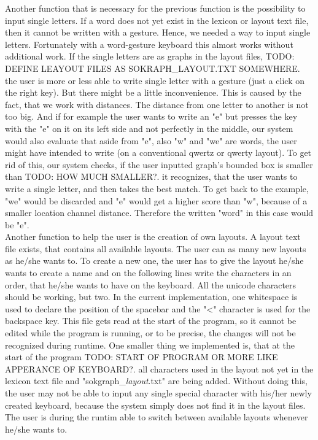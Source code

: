 Another function that is necessary for the previous function is the possibility to input single letters. If a word does not yet exist in the lexicon or layout text file, then it cannot be written with a gesture. Hence, we needed a way to input single letters. Fortunately with a word-gesture keyboard this almost works without additional work. If the single letters are as graphs in the layout files, TODO: DEFINE LEAYOUT FILES AS SOKRAPH_LAYOUT.TXT SOMEWHERE. the user is more or less able to write single letter with a gesture (just a click on the right key). But there might be a little inconvenience. This is caused by the fact, that we work with distances. The distance from one letter to another is not too big. And if for example the user wants to write an "e" but presses the key with the "e" on it on its left side and not perfectly in the middle, our system would also evaluate that aside from "e", also "w" and "we" are words, the user might have intended to write (on a conventional qwertz or qwerty layout). To get rid of this, our system checks, if the user inputted graph's bounded box is smaller than TODO: HOW MUCH SMALLER?. it recognizes, that the user wants to write a single letter, and then takes the best match. To get back to the example, "we" would be discarded and "e" would get a higher score than "w", because of a smaller location channel distance. Therefore the written "word" in this case would be "e".\\
Another function to help the user is the creation of own layouts. A layout text file exists, that contains all available layouts. The user can as many new layouts as he/she wants to. To create a new one, the user has to give the layout he/she wants to create a name and on the following lines write the characters in an order, that he/she wants to have on the keyboard. All the unicode characters should be working, but two. In the current implementation, one whitespace is used to declare the position of the spacebar and the "<" character is used for the backspace key. This file gets read at the start of the program, so it cannot be edited while the program is running, or to be precise, the changes will not be recognized during runtime. One smaller thing we implemented is, that at the start of the program TODO: START OF PROGRAM OR MORE LIKE APPERANCE OF KEYBOARD?. all characters used in the layout not yet in the lexicon text file and "sokgraph\_\textit{layout}.txt" are being added. Without doing this, the user may not be able to input any single special character with his/her newly created keyboard, because the system simply does not find it in the layout files. The user is during the runtim able to switch between available layouts whenever he/she wants to.\\
